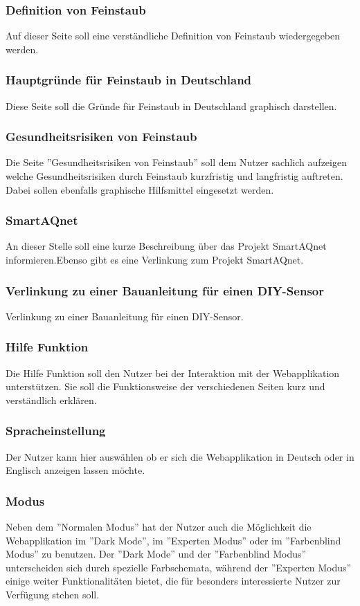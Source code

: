 \subsubsection{Definition von Feinstaub}
Auf dieser Seite soll eine verständliche Definition von Feinstaub wiedergegeben werden.


\subsubsection{Hauptgründe für Feinstaub in Deutschland}
Diese Seite soll die Gründe für Feinstaub in Deutschland graphisch darstellen.


\subsubsection{Gesundheitsrisiken von Feinstaub}
Die Seite ''Gesundheitsrisiken von Feinstaub'' soll dem Nutzer sachlich aufzeigen welche Gesundheitsrisiken durch Feinstaub kurzfristig und langfristig auftreten. Dabei sollen ebenfalls graphische Hilfsmittel eingesetzt werden.

\subsubsection{SmartAQnet}
An dieser Stelle soll eine kurze Beschreibung über das Projekt SmartAQnet informieren.Ebenso gibt es eine Verlinkung zum Projekt SmartAQnet.

\subsubsection{Verlinkung zu einer Bauanleitung für einen DIY-Sensor}
Verlinkung zu einer Bauanleitung für einen DIY-Sensor.

\subsubsection{Hilfe Funktion}
Die Hilfe Funktion soll den Nutzer bei der Interaktion mit der Webapplikation unterstützen. Sie soll die Funktionsweise der verschiedenen Seiten kurz und verständlich erklären.

\subsubsection{Spracheinstellung}
Der Nutzer kann hier auswählen ob er sich die Webapplikation in Deutsch oder in Englisch anzeigen lassen möchte.

\subsubsection{Modus}
Neben dem ''Normalen Modus'' hat der Nutzer auch die Möglichkeit die Webapplikation im ''Dark Mode'', im ''Experten Modus'' oder im ''Farbenblind Modus'' zu benutzen.
Der ''Dark Mode'' und der ''Farbenblind Modus'' unterscheiden sich durch spezielle Farbschemata, während der ''Experten Modus'' einige weiter Funktionalitäten bietet, die für besonders interessierte Nutzer zur Verfügung stehen soll. 

